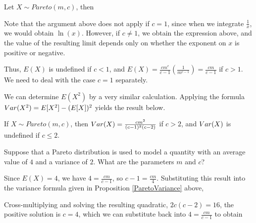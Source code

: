\begin{pf} Let $X \sim Pareto(m,c)$, then
\par
\noindent Note that the argument above does not apply if $c = 1$, since when we integrate $\frac{1}{x}$, we would obtain $\ln(x)$. However, if $c \neq 1$, we obtain the expression above, and the value of the resulting limit depends only on whether the exponent on $x$ is positive or negative.
\renewcommand*{\arraystretch}{1}
\par
\noindent Thus, $E(X)$ is undefined if $c<1$, and $E(X) =  \frac{cm^c}{c-1}\left(\frac{1}{m^{c-1}}\right) = \frac{cm}{c-1}$ if $c >1$. We need to deal with the case $c=1$ separately.
\end{pf}

We can determine $E(X^2)$ by a very similar calculation. Applying the formula $Var(X^2) = E[X^2] - (E[X])^2$ yields the result below.

\begin{prop}\label{ParetoVariance}If $X \sim Pareto(m,c)$, then $Var(X) = \frac{cm^2}{(c-1)^2(c-2)}$ if $c>2$, and $Var(X)$ is undefined if $c \leq 2$.\end{prop}

\begin{examp} Suppose that a Pareto distribution is used to model a quantity with an average value of $4$ and a variance of $2$. What are the parameters $m$ and $c$?
\par
\noindent Since $E(X) = 4$, we have $4 = \frac{cm}{c-1}$, so $c-1 = \frac{cm}{4}$. Substituting this result into the variance formula given in Proposition \ref{ParetoVariance} above,
\par
\noindent Cross-multiplying and solving the resulting quadratic, $2c(c-2) = 16$, the positive solution is $c = 4$, which we can substitute back into $4 = \frac{cm}{c-1}$ to obtain

\end{examp}


